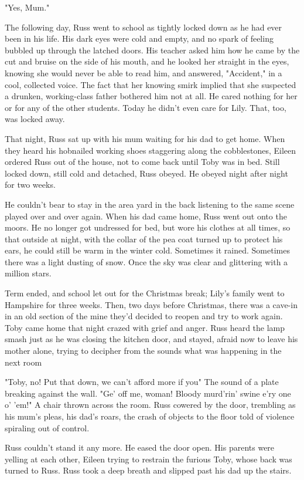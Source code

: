 "Yes, Mum."

The following day, Russ went to school as tightly locked down as he had ever been in his life. His dark eyes were cold and empty, and no spark of feeling bubbled up through the latched doors. His teacher asked him how he came by the cut and bruise on the side of his mouth, and he looked her straight in the eyes, knowing she would never be able to read him, and answered, "Accident," in a cool, collected voice. The fact that her knowing smirk implied that she suspected a drunken, working-class father bothered him not at all. He cared nothing for her or for any of the other students. Today he didn't even care for Lily. That, too, was locked away.

That night, Russ sat up with his mum waiting for his dad to get home. When they heard his hobnailed working shoes staggering along the cobblestones, Eileen ordered Russ out of the house, not to come back until Toby was in bed. Still locked down, still cold and detached, Russ obeyed. He obeyed night after night for two weeks.

He couldn't bear to stay in the area yard in the back listening to the same scene played over and over again. When his dad came home, Russ went out onto the moors. He no longer got undressed for bed, but wore his clothes at all times, so that outside at night, with the collar of the pea coat turned up to protect his ears, he could still be warm in the winter cold. Sometimes it rained. Sometimes there was a light dusting of snow. Once the sky was clear and glittering with a million stars.

Term ended, and school let out for the Christmas break; Lily's family went to Hampshire for three weeks. Then, two days before Christmas, there was a cave-in in an old section of the mine they'd decided to reopen and try to work again. Toby came home that night crazed with grief and anger. Russ heard the lamp smash just as he was closing the kitchen door, and stayed, afraid now to leave his mother alone, trying to decipher from the sounds what was happening in the next room

"Toby, no! Put that down, we can't afford more if you{\el}" The sound of a plate breaking against the wall. "Ge' off me, woman! Bloody murd'rin' swine e'ry one o' 'em!" A chair thrown across the room. Russ cowered by the door, trembling as his mum's pleas, his dad's roars, the crash of objects to the floor told of violence spiraling out of control.

Russ couldn't stand it any more. He eased the door open. His parents were yelling at each other, Eileen trying to restrain the furious Toby, whose back was turned to Russ. Russ took a deep breath and slipped past his dad up the stairs.

